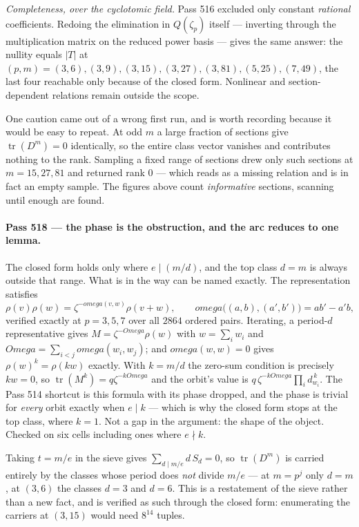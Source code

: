 \documentclass[12pt,a4paper]{article}
\def\mathbf#1{#1}%
\def\omega{omega}%
\def\Omega{Omega}%
\theoremstyle{definition}
\begin{document}
\emph{Completeness, over the cyclotomic field.}  Pass 516 excluded only
constant \emph{rational} coefficients.  Redoing the elimination in
$\mathbf{Q}(\zeta_p)$ itself --- inverting through the multiplication matrix on
the reduced power basis --- gives the same answer: the nullity equals
$\lvert T\rvert$ at $(p,m)=(3,6),(3,9),(3,15),(3,27),(3,81),(5,25),(7,49)$, the
last four reachable only because of the closed form.  Nonlinear and
section-dependent relations remain outside the scope.

One caution came out of a wrong first run, and is worth recording because it
would be easy to repeat.  At odd $m$ a large fraction of sections give
$\operatorname{tr}(D^m)=0$ identically, so the entire class vector vanishes and
contributes nothing to the rank.  Sampling a fixed range of sections drew only
such sections at $m=15,27,81$ and returned rank $0$ --- which reads as a
missing relation and is in fact an empty sample.  The figures above count
\emph{informative} sections, scanning until enough are found.

\paragraph{Pass 518 --- the phase is the obstruction, and the arc reduces to one
lemma.}
The closed form holds only where $e\mid(m/d)$, and the top class $d=m$ is always
outside that range.  What is in the way can be named exactly.  The
representation satisfies
\[
\rho(v)\rho(w)=\zeta^{-\omega(v,w)}\rho(v+w),\qquad
\omega\bigl((a,b),(a',b')\bigr)=ab'-a'b,
\]
verified exactly at $p=3,5,7$ over all $2864$ ordered pairs.  Iterating, a
period-$d$ representative gives $M=\zeta^{-\Omega}\rho(w)$ with
$w=\sum_i w_i$ and $\Omega=\sum_{i<j}\omega(w_i,w_j)$; and $\omega(w,w)=0$ gives
$\rho(w)^k=\rho(kw)$ exactly.  With $k=m/d$ the zero-sum condition is precisely
$kw=0$, so $\operatorname{tr}(M^k)=q\zeta^{-k\Omega}$ and the orbit's value is
$q\,\zeta^{-k\Omega}\prod_i d_{w_i}^{\,k}$.  The Pass 514 shortcut is this
formula with its phase dropped, and the phase is trivial for \emph{every} orbit
exactly when $e\mid k$ --- which is why the closed form stops at the top class,
where $k=1$.  Not a gap in the argument: the shape of the object.  Checked on
six cells including ones where $e\nmid k$.

Taking $t=m/e$ in the sieve gives $\sum_{d\mid m/e}d\,S_d=0$, so
$\operatorname{tr}(D^m)$ is carried entirely by the classes whose period does
\emph{not} divide $m/e$ --- at $m=p^{j}$ only $d=m$, at $(3,6)$ the classes
$d=3$ and $d=6$.  This is a restatement of the sieve rather than a new fact, and
is verified as such through the closed form: enumerating the carriers at
$(3,15)$ would need $8^{14}$ tuples.
\end{document}
